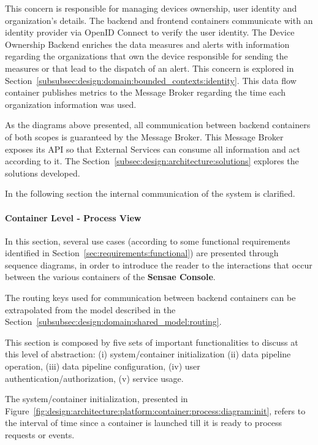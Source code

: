 This concern is responsible for managing devices ownership, user identity and organization's details. The backend and frontend containers communicate with an identity provider via OpenID Connect to verify the user identity. The Device Ownership Backend enriches the data measures and alerts with information regarding the organizations that own the device responsible for sending the measures or that lead to the dispatch of an alert. This concern is explored in Section~\ref{subsubsec:design:domain:bounded_contexts:identity}. This data flow container publishes metrics to the Message Broker regarding the time each organization information was used.

As the diagrams above presented, all communication between backend containers of both scopes is guaranteed by the Message Broker. This Message Broker exposes its \gls{API} so that External Services can consume all information and act according to it. The Section~\ref{subsec:design:architecture:solutions} explores the solutions developed.

In the following section the internal communication of the system is clarified.

\paragraph{Container Level - Process View}
\label{par:design:architecture:platform:container:process}

In this section, several use cases (according to some functional requirements identified in Section~\ref{sec:requirements:functional}) are presented through sequence diagrams, in order to introduce the reader to the interactions that occur between the various containers of the \textbf{Sensae Console}.

The routing keys used for communication between backend containers can be extrapolated from the model described in the Section~\ref{subsubsec:design:domain:shared_model:routing}.

This section is composed by five sets of important functionalities to discuss at this level of abstraction: (i) system/container initialization (ii) data pipeline operation, (iii) data pipeline configuration, (iv) user authentication/authorization, (v) service usage.

The system/container initialization, presented in Figure~\ref{fig:design:architecture:platform:container:process:diagram:init}, refers to the interval of time since a container is launched till it is ready to process requests or events.

